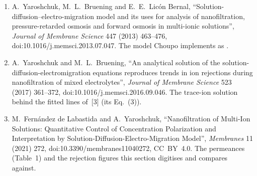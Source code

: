\begin{enumerate}
\item[{[1]}] A.~Yaroshchuk, M.~L.~Bruening and E.~E.~Lic\'on Bernal,
  ``Solution-diffusion--electro-migration model and its uses for analysis of
  nanofiltration, pressure-retarded osmosis and forward osmosis in multi-ionic
  solutions'', \emph{Journal of Membrane Science} 447 (2013) 463--476,
  doi:10.1016/j.memsci.2013.07.047.  The model Choupo implements as
  .
\item[{[2]}] A.~Yaroshchuk and M.~L.~Bruening, ``An analytical solution of
  the solution-diffusion-electromigration equations reproduces trends in ion
  rejections during nanofiltration of mixed electrolytes'', \emph{Journal of
  Membrane Science} 523 (2017) 361--372, doi:10.1016/j.memsci.2016.09.046.
  The trace-ion solution behind the fitted lines of~[3] (its Eq.~(3)).
\item[{[3]}] M.~Fern\'andez de Labastida and A.~Yaroshchuk, ``Nanofiltration
  of Multi-Ion Solutions: Quantitative Control of Concentration Polarization
  and Interpretation by Solution-Diffusion-Electro-Migration Model'',
  \emph{Membranes} 11 (2021) 272, doi:10.3390/membranes11040272, CC~BY~4.0.
  The permeances (Table~1) and the rejection figures this section digitises
  and compares against.
\end{enumerate}
